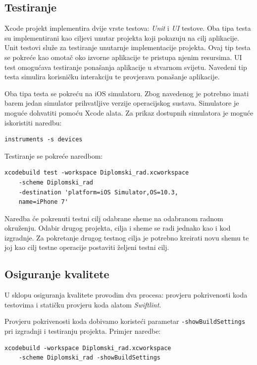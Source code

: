 \documentclass[times, utf8, diplomski, numeric]{fer}
\begin{document}
\begin{appendices}
\subsection{Testiranje} \label{TestiranjeXcodeBuild}

Xcode projekt implementira dvije vrste testova: \textit{Unit} i \textit{UI} testove. Oba tipa testa su implementirani kao ciljevi unutar projekta koji pokazuju na cilj aplikacije. Unit testovi služe za testiranje unutarnje implementacije projekta. Ovaj tip testa se pokreće kao omotač oko izvorne aplikacije te pristupa njenim resursima. UI test omogućava testiranje ponašanja aplikacije u stvarnom svijetu. Navedeni tip testa simulira korisničku interakciju te provjerava ponašanje aplikacije.

Oba tipa testa se pokreću na iOS simulatoru. Zbog navedenog je potrebno imati barem jedan simulator prihvatljive verzije operacijskog sustava. Simulatore je moguće dohvatiti pomoću Xcode alata. Za prikaz dostupnih simulatora je moguće iskoristiti naredbu:

\begin{verbatim}
instruments -s devices
\end{verbatim}

Testiranje se pokreće naredbom:

\begin{verbatim}
xcodebuild test -workspace Diplomski_rad.xcworkspace
    -scheme Diplomski_rad
    -destination 'platform=iOS Simulator,OS=10.3,
    name=iPhone 7'
\end{verbatim}

Naredba će pokrenuti testni cilj odabrane sheme na odabranom radnom okruženju. Odabir drugog projekta, cilja i sheme se radi jednako kao i kod izgradnje. Za pokretanje drugog testnog cilja je potrebno kreirati novu shemu te joj kao cilj testne operacije postaviti željeni testni cilj.

\subsection{Osiguranje kvalitete} \label{OsiguranjeKvaliteteImplementacija}

U sklopu osiguranja kvalitete provodim dva procesa: provjeru pokrivenosti koda testovima i statičku provjeru koda alatom \textit{Swiftlint}.

Provjeru pokrivenosti koda dobivamo koristeći parametar \verb|-showBuildSettings| pri izgradnji i testiranju projekta. Primjer naredbe:

\begin{verbatim}
xcodebuild -workspace Diplomski_rad.xcworkspace
    -scheme Diplomski_rad -showBuildSettings
\end{verbatim}


\end{appendices}
\end{document}
